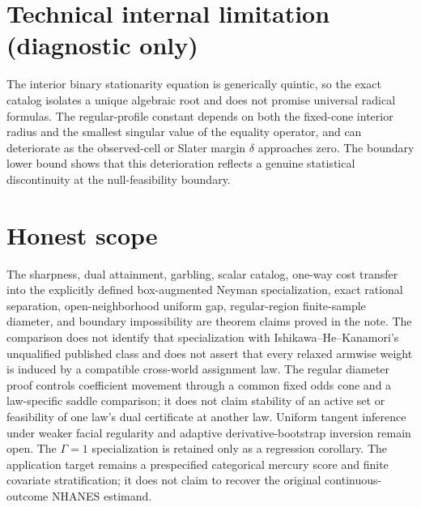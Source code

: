 \documentclass{article}
\begin{document}
\section*{Technical internal limitation (diagnostic only)}

The interior binary stationarity equation is generically quintic, so the exact catalog isolates a unique algebraic root and does not promise universal radical formulas. The regular-profile constant depends on both the fixed-cone interior radius and the smallest singular value of the equality operator, and can deteriorate as the observed-cell or Slater margin \(\delta\) approaches zero. The boundary lower bound shows that this deterioration reflects a genuine statistical discontinuity at the null-feasibility boundary.

\section{Honest scope}

The sharpness, dual attainment, garbling, scalar catalog, one-way cost transfer into the explicitly defined box-augmented Neyman specialization, exact rational separation, open-neighborhood uniform gap, regular-region finite-sample diameter, and boundary impossibility are theorem claims proved in the note. The comparison does not identify that specialization with Ishikawa--He--Kanamori's unqualified published class and does not assert that every relaxed armwise weight is induced by a compatible cross-world assignment law. The regular diameter proof controls coefficient movement through a common fixed odds cone and a law-specific saddle comparison; it does not claim stability of an active set or feasibility of one law's dual certificate at another law. Uniform tangent inference under weaker facial regularity and adaptive derivative-bootstrap inversion remain open. The \(\Gamma=1\) specialization is retained only as a regression corollary. The application target remains a prespecified categorical mercury score and finite covariate stratification; it does not claim to recover the original continuous-outcome NHANES estimand.
\end{document}
